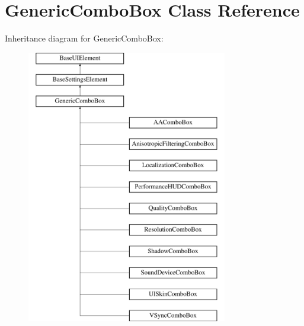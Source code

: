 \hypertarget{class_generic_combo_box}{}\section{Generic\+Combo\+Box Class Reference}
\label{class_generic_combo_box}
Inheritance diagram for Generic\+Combo\+Box\+:\begin{figure}[H]
\begin{center}
\leavevmode
\includegraphics[height=12.000000cm]{class_generic_combo_box}
\end{center}
\end{figure}
